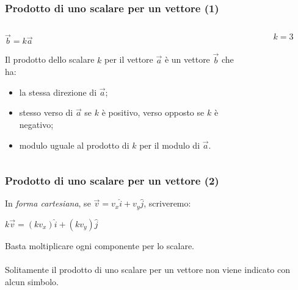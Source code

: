 \documentclass[]{beamer}
\theoremstyle{plain}
\begin{document}
\begin{frame}
  \frametitle{Prodotto di uno scalare per un vettore (1)}
  
\begin{columns}
\begin{column}{0.7\textwidth}

\begin{center}
\colorbox{blue!30}{ $ \vec{b} = k\vec{a} $ }
\end{center}
  Il prodotto dello scalare $ k $ per il vettore $ \vec{a} $ è un vettore $ \vec{b} $ che ha:
  \begin{itemize}
    \item la stessa direzione di $ \vec{a} $;\pause
    \item stesso verso di $ \vec{a} $ se $ k $ è positivo, verso opposto se $ k $ è negativo;\pause
    \item modulo uguale al prodotto di $ k $ per il modulo di $ \vec{a} $.
  \end{itemize}

\end{column}
\begin{column}{0.3\textwidth}

\begin{figure}

$ k=3 $
\end{figure}

\end{column}
\end{columns}
\end{frame}

\begin{frame}
  \frametitle{Prodotto di uno scalare per un vettore (2)}
    In \emph{forma cartesiana}, se $ \vec{v} = v_x \hat{i} + v_y \hat{j} $, scriveremo:
  \begin{center}
\colorbox{blue!30}{ $ k \vec{v} = (k v_x)\hat{i} + (k v_y)\hat{j} $ }
\end{center}Basta moltiplicare ogni componente per lo scalare.\\~\\\pause
  Solitamente il prodotto di uno scalare per un vettore non viene indicato con alcun simbolo.
\end{frame}
\end{document}
